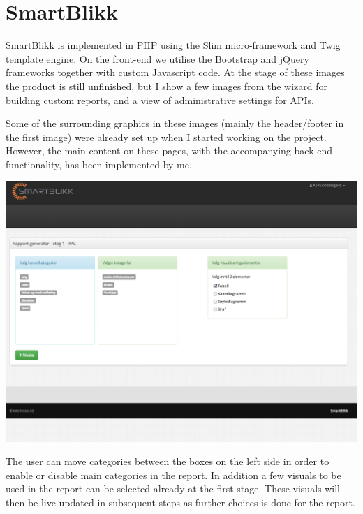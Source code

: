 \documentclass[11pt]{article}
\begin{document}
\section*{SmartBlikk}
SmartBlikk is implemented in PHP using the Slim micro-framework and Twig template engine. On the front-end we utilise the Bootstrap and jQuery frameworks together with custom Javascript code. At the stage of these images the product is still unfinished, but I show a few images from the wizard for building custom reports, and a view of administrative settings for APIs. 

Some of the surrounding graphics in these images (mainly the header/footer in the first image) were already set up when I started working on the project. However, the main content on these pages, with the accompanying back-end functionality, has been implemented by me. 

\vspace{2\baselineskip}
\noindent
\includegraphics[width=\textwidth]{portfolio-graphics/sb-stage1.png}

\vspace{\baselineskip}
\noindent
The user can move categories between the boxes on the left side in order to enable or disable main categories in the report. In addition a few visuals to be used in the report can be selected already at the first stage. These visuals will then be live updated in subsequent steps as further choices is done for the report.
 
\end{document}
